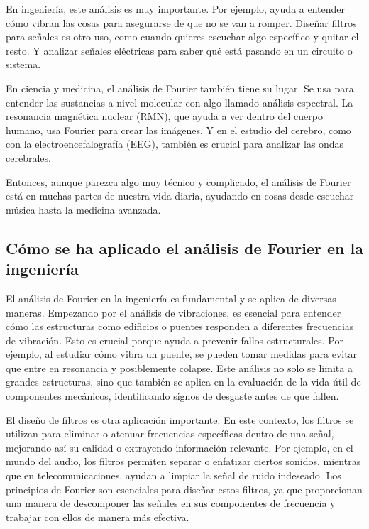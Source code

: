 En ingeniería, este análisis es muy importante. Por ejemplo, ayuda a entender cómo vibran las cosas para asegurarse de que no se van a romper. Diseñar filtros para señales es otro uso, como cuando quieres escuchar algo específico y quitar el resto. Y analizar señales eléctricas para saber qué está pasando en un circuito o sistema.

En ciencia y medicina, el análisis de Fourier también tiene su lugar. Se usa para entender las sustancias a nivel molecular con algo llamado análisis espectral. La resonancia magnética nuclear (RMN), que ayuda a ver dentro del cuerpo humano, usa Fourier para crear las imágenes. Y en el estudio del cerebro, como con la electroencefalografía (EEG), también es crucial para analizar las ondas cerebrales\cite*{wikipedia-analisis-espectral-2019,mayo-clinic-eeg-2022}.

Entonces, aunque parezca algo muy técnico y complicado, el análisis de Fourier está en muchas partes de nuestra vida diaria, ayudando en cosas desde escuchar música hasta la medicina avanzada.

\subsection{Cómo se ha aplicado el análisis de Fourier en la ingeniería}

El análisis de Fourier en la ingeniería es fundamental y se aplica de diversas maneras. Empezando por el análisis de vibraciones, es esencial para entender cómo las estructuras como edificios o puentes responden a diferentes frecuencias de vibración\cite*{aula-2023}. Esto es crucial porque ayuda a prevenir fallos estructurales. Por ejemplo, al estudiar cómo vibra un puente, se pueden tomar medidas para evitar que entre en resonancia y posiblemente colapse. Este análisis no solo se limita a grandes estructuras, sino que también se aplica en la evaluación de la vida útil de componentes mecánicos, identificando signos de desgaste antes de que fallen.

El diseño de filtros es otra aplicación importante. En este contexto, los filtros se utilizan para eliminar o atenuar frecuencias específicas dentro de una señal, mejorando así su calidad o extrayendo información relevante. Por ejemplo, en el mundo del audio, los filtros permiten separar o enfatizar ciertos sonidos, mientras que en telecomunicaciones, ayudan a limpiar la señal de ruido indeseado. Los principios de Fourier son esenciales para diseñar estos filtros, ya que proporcionan una manera de descomponer las señales en sus componentes de frecuencia y trabajar con ellos de manera más efectiva.

